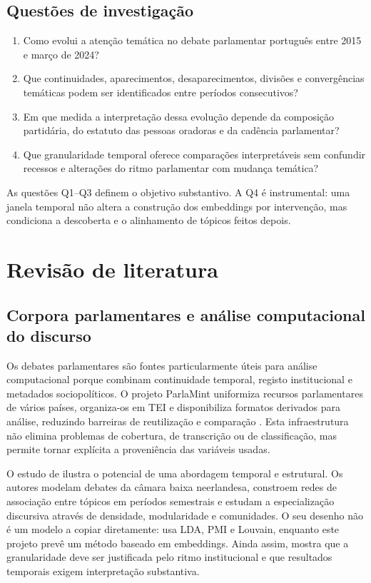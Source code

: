 \documentclass[11pt,a4paper]{article}
\begin{document}
\subsection{Questões de investigação}

\begin{enumerate}[label=\textbf{Q\arabic*.}]
  \item Como evolui a atenção temática no debate parlamentar português entre 2015 e março de 2024?
  \item Que continuidades, aparecimentos, desaparecimentos, divisões e convergências temáticas podem ser identificados entre períodos consecutivos?
  \item Em que medida a interpretação dessa evolução depende da composição partidária, do estatuto das pessoas oradoras e da cadência parlamentar?
  \item Que granularidade temporal oferece comparações interpretáveis sem confundir recessos e alterações do ritmo parlamentar com mudança temática?
\end{enumerate}

As questões Q1--Q3 definem o objetivo substantivo. A Q4 é instrumental: uma janela temporal não altera a construção dos embeddings por intervenção, mas condiciona a descoberta e o alinhamento de tópicos feitos depois.

\section{Revisão de literatura}

\subsection{Corpora parlamentares e análise computacional do discurso}

Os debates parlamentares são fontes particularmente úteis para análise computacional porque combinam continuidade temporal, registo institucional e metadados sociopolíticos. O projeto ParlaMint uniformiza recursos parlamentares de vários países, organiza-os em TEI e disponibiliza formatos derivados para análise, reduzindo barreiras de reutilização e comparação \citep{erjavec2023parlamint}. Esta infraestrutura não elimina problemas de cobertura, de transcrição ou de classificação, mas permite tornar explícita a proveniência das variáveis usadas.

O estudo de \citet{roswevers2025epistemic} ilustra o potencial de uma abordagem temporal e estrutural. Os autores modelam debates da câmara baixa neerlandesa, constroem redes de associação entre tópicos em períodos semestrais e estudam a especialização discursiva através de densidade, modularidade e comunidades. O seu desenho não é um modelo a copiar diretamente: usa LDA, PMI e Louvain, enquanto este projeto prevê um método baseado em embeddings. Ainda assim, mostra que a granularidade deve ser justificada pelo ritmo institucional e que resultados temporais exigem interpretação substantiva.
\end{document}

